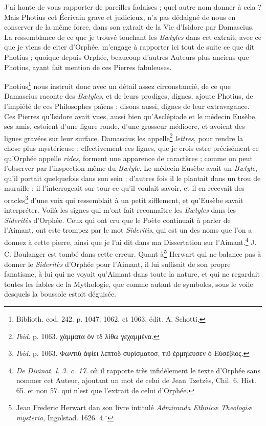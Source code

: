 \documentclass[a4paper, 11pt, oneside, polutonikogreek, french, landscape]{article}
\begin{document}
J'ai honte de vous rapporter de pareilles fadaises ; quel autre nom donner à cela ? Mais Photius cet Écrivain grave et judicieux, n'a pas dédaigné de nous en conserver de la même force, dans son extrait de la Vie d'Isidore par Damascius. La ressemblance de ce que je trouvé touchant les \emph{Bætyles} dans cet extrait, avec ce que je viens de citer d'Orphée, m'engage à rapporter ici tout de suite ce que dit Photius ; quoique depuis Orphée, beaucoup d'autres Auteurs plus anciens que Photius, ayant fait mention de ces Pierres fabuleuses.

Photius\footnote{Biblioth. cod. 242. p. 1047. 1062. et 1063. édit. A. Schotti.} nous instruit donc avec un détail assez circonstancié, de ce que Damascius raconte des \emph{Bætyles}, et de leurs prodiges, dignes, ajoute Photius, de l'impiété de ces Philosophes païens ; disons aussi, dignes de leur extravagance. Ces Pierres qu'Isidore avait vues, aussi bien qu'Asclépiade et le médecin Eusèbe, ses amis, estoient d'une figure ronde, d'une grosseur médiocre, et avoient des lignes gravées sur leur surface. Damascius les appelle\footnote{\emph{Ibid.} p. 1063. χάμματα ὀν τδ λίθω γεχαμμένα.} \emph{lettres}, pour rendre la chose plus mystérieuse : effectivement ces lignes, que je crois estre précisément ce qu'Orphée appelle \emph{rides}, forment une apparence de caractères ; comme on peut l'observer par l'inspection même du \emph{Bætyle}. Le médecin Eusèbe avait un \emph{Bætyle}, qu'il portait quelquefois dans son sein ; d'autres fois il le plantait dans un trou de muraille : il l'interrogeait sur tour ce qu'il voulait savoir, et il en recevait des oracles\footnote{\emph{Ibid.} p. 1063. Φωντιὺ ἀφίει λεπτοδ συρίσματοσ, τιὒ ἑρμηίευσεν ὁ Εὐσέβιος.} d'une voix qui ressemblait à un petit sifflement, et qu'Eusèbe savait interpréter. Voilà les signes qui m'ont fait reconnaître les \emph{Bætyles} dans les \emph{Sideritès} d'Orphée. Ceux qui ont cru que le Poète continuait à parler de l'Aimant, ont este trompez par le mot \emph{Sideritis}, qui est un des noms que l'on a donnez à cette pierre, ainsi que je l'ai dit dans ma Dissertation sur l'Aimant.\footnote{\emph{De Divinat. l. 3. c. 17.} où il rapporte très infidèlement le texte d'Orphée sans nommer cet Auteur, ajoutant un mot de celui de Jean Tzetzès, Chil. 6. Hist. 65. et non 57. qui n'est que l'extrait de celui d'Orphée.} J. C. Boulanger est tombé dans cette erreur. Quant à\footnote{Jean Frederic Herwart dan son livre intitulé \emph{Admiranda Ethnicæ Theologiæ mysteria}, Ingolstad. 1626. 4.$^\circ$} Herwart qui ne balance pas à donner le \emph{Sideritès} d'Orphée pour l'Aimant, il lui suffisait de son propre fanatisme, à lui qui ne voyait qu'Aimant dans toute la nature, et qui ne regardait toutes les fables de la Mythologie, que comme autant de symboles, sous le voile desquels la boussole estoit déguisée.
\end{document}
